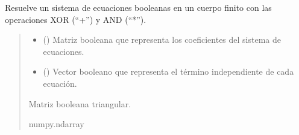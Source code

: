 \documentclass[letterpaper,10pt,english]{sphinxmanual}
\begin{document}
\begin{fulllineitems}
\label{\detokenize{myutils:myutils.bool.gauss_elimination_gf2}}
\pysigstartsignatures
{}
\pysigstopsignatures
\sphinxAtStartPar
Resuelve un sistema de ecuaciones booleanas en un cuerpo finito con las operaciones XOR (“+”) y AND (“*”).
\begin{quote}\begin{description}
\begin{itemize}
\item {} 
\sphinxAtStartPar
{} () \textendash{} Matriz booleana que representa los coeficientes del sistema de ecuaciones.

\item {} 
\sphinxAtStartPar
{} () \textendash{} Vector booleano que representa el término independiente de cada ecuación.

\end{itemize}

\sphinxAtStartPar
Matriz booleana triangular.

\sphinxAtStartPar
numpy.ndarray

\end{description}\end{quote}

\end{fulllineitems}

\end{document}
